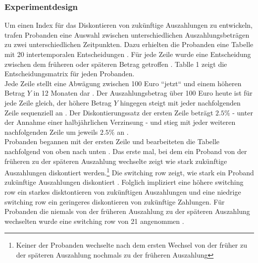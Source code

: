 \documentclass[11pt,a4paper]{article}
\begin{document}
\subsubsection{Experimentdesign}
Um einen Index für das Diskontieren von zukünftige Auszahlungen zu entwickeln, trafen Probanden eine Auswahl zwischen unterschiedlichen Auszahlungsbeträgen zu zwei unterschiedlichen Zeitpunkten. Dazu erhielten die Probanden eine Tabelle mit 20 intertemporalen Entscheidungen \parencite{dohmen2010risk}. Für jede Zeile wurde eine  Entscheidung zwischen dem früheren oder späteren Betrag getroffen \parencite{dohmen2010risk}. Tablle 1 zeigt die Entscheidungsmatrix für jeden Probanden.\\
Jede Zeile stellt eine Abwägung zwischen 100 Euro “jetzt“ und einem höheren Betrag $Y$ in 12 Monaten dar \parencite{dohmen2010risk}. Der Auszahlungsbetrag über 100 Euro heute ist für jede Zeile gleich, der höhere Betrag $Y$ hingegen steigt mit jeder nachfolgenden Zeile sequenziell an \parencite{dohmen2010risk}. Der Diskontierungssatz der ersten Zeile beträgt $2.5\%$ - unter der Annahme einer halbjährlichen Verzinsung - und stieg mit jeder weiteren nachfolgenden Zeile um jeweils $2.5\%$ an \parencite{dohmen2010risk}.\\

Probanden begannen mit der ersten Zeile und bearbeiteten die Tabelle nachfolgend von oben nach unten \parencite{dohmen2010risk}. Das erste mal, bei dem ein Proband von der früheren zu der späteren Auszahlung wechselte zeigt wie stark zukünftige Auszahlungen diskontiert werden.\footnote{Keiner der Probanden wechselte nach dem ersten Wechsel von der früher zu der späteren Auszahlung nochmals zu der früheren Auszahlung} Die switching row zeigt, wie stark ein Proband zukünftige Auszahlungen diskontiert \parencite{becker2012relationship}. Folglich impliziert eine höhere switching row ein starkes disktontieren von zukünftigen Auszahlungen und eine niedrige switching row ein geringeres diskontieren von  zukünftige Zahlungen. Für Probanden die niemals von der früheren Auszahlung zu der späteren Auszahlung wechselten wurde eine switching row von 21 angenommen \parencite{dohmen2012interpreting}.\\
\end{document}
